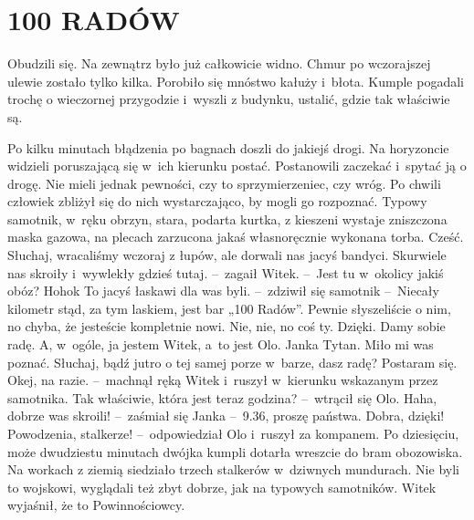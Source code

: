 \documentclass[../MAIN.tex]{subfiles}
\begin{document}
\section*{100 RADÓW}
\mm Obudzili się. Na zewnątrz było już całkowicie widno. Chmur po wczorajszej ulewie zostało tylko kilka. Porobiło się mnóstwo kałuży i~błota. Kumple pogadali trochę o wieczornej przygodzie i~wyszli z budynku, ustalić, gdzie tak właściwie są.

Po kilku minutach błądzenia po bagnach doszli do jakiejś drogi.
Na horyzoncie widzieli poruszającą się w~ich kierunku postać. Postanowili zaczekać i~spytać ją o drogę. Nie mieli jednak pewności, czy to sprzymierzeniec, czy wróg.%
\pp
Po chwili człowiek zbliżył się do nich wystarczająco, by mogli go rozpoznać. Typowy samotnik, w~ręku obrzyn, stara, podarta kurtka, z kieszeni wystaje zniszczona maska gazowa, na plecach zarzucona jakaś własnoręcznie wykonana torba.
\dd
\sd
\xx Cześć. Słuchaj, wracaliśmy wczoraj z łupów, ale dorwali nas jacyś bandyci.
Skurwiele nas skroiły i~wywlekły gdzieś tutaj. --~zagaił Witek. --~Jest tu w~okolicy jakiś obóz?
\xx Hoho\3k To jacyś łaskawi dla was byli. --~zdziwił się samotnik --~Niecały kilometr stąd, za tym laskiem, jest bar „100 Radów”. Pewnie słyszeliście o nim, no chyba, że jesteście kompletnie nowi.
\xx Nie, nie, no coś ty. Dzięki. Damy sobie radę. A, w~ogóle, ja jestem Witek, a~to jest Olo.
\xx Janka Tytan. Miło mi was poznać.
\xx Słuchaj, bądź jutro o tej samej porze w~barze, dasz radę?
\xx Postaram się.
\xx Okej, na razie. --~machnął ręką Witek i~ruszył w~kierunku wskazanym przez samotnika.
\xx Tak właściwie, która jest teraz godzina? --~wtrącił się Olo.
\xx Haha, dobrze was skroili! --~zaśmiał się Janka --~9.36, proszę państwa.
\xx Dobra, dzięki! Powodzenia, stalkerze! --~odpowiedział Olo i~ruszył za kompanem.
\qm
Po dziesięciu, może dwudziestu minutach dwójka kumpli dotarła wreszcie do bram obozowiska. Na workach z ziemią siedziało trzech stalkerów w~dziwnych mundurach. Nie byli to wojskowi, wyglądali też zbyt dobrze, jak na typowych samotników. Witek wyjaśnił, że to Powinnościowcy.
\end{document}

